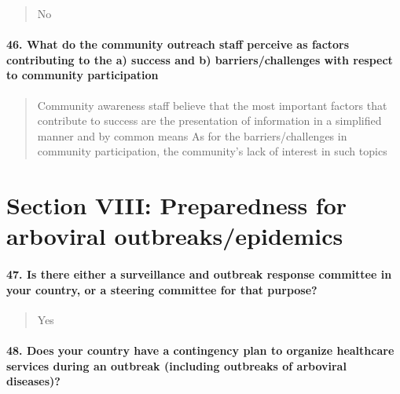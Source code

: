 \documentclass[
]{article}
\begin{document}
\begin{quote}
No
\end{quote}

\hypertarget{what-do-the-community-outreach-staff-perceive-as-factors-contributing-to-the-a-success-and-b-barrierschallenges-with-respect-to-community-participation}{%
\paragraph{46. What do the community outreach staff perceive as factors
contributing to the a) success and b) barriers/challenges with respect
to community
participation}\label{what-do-the-community-outreach-staff-perceive-as-factors-contributing-to-the-a-success-and-b-barrierschallenges-with-respect-to-community-participation}}

\begin{quote}
Community awareness staff believe that the most important factors that
contribute to success are the presentation of information in a
simplified manner and by common means As for the barriers/challenges in
community participation, the community's lack of interest in such topics
\end{quote}

\hypertarget{section-viii-preparedness-for-arboviral-outbreaksepidemics}{%
\section{Section VIII: Preparedness for arboviral
outbreaks/epidemics}\label{section-viii-preparedness-for-arboviral-outbreaksepidemics}}

\hypertarget{is-there-either-a-surveillance-and-outbreak-response-committee-in-your-country-or-a-steering-committee-for-that-purpose}{%
\paragraph{47. Is there either a surveillance and outbreak response
committee in your country, or a steering committee for that
purpose?}\label{is-there-either-a-surveillance-and-outbreak-response-committee-in-your-country-or-a-steering-committee-for-that-purpose}}

\begin{quote}
Yes
\end{quote}

\hypertarget{does-your-country-have-a-contingency-plan-to-organize-healthcare-services-during-an-outbreak-including-outbreaks-of-arboviral-diseases}{%
\paragraph{48. Does your country have a contingency plan to organize
healthcare services during an outbreak (including outbreaks of arboviral
diseases)?}\label{does-your-country-have-a-contingency-plan-to-organize-healthcare-services-during-an-outbreak-including-outbreaks-of-arboviral-diseases}}
\end{document}
